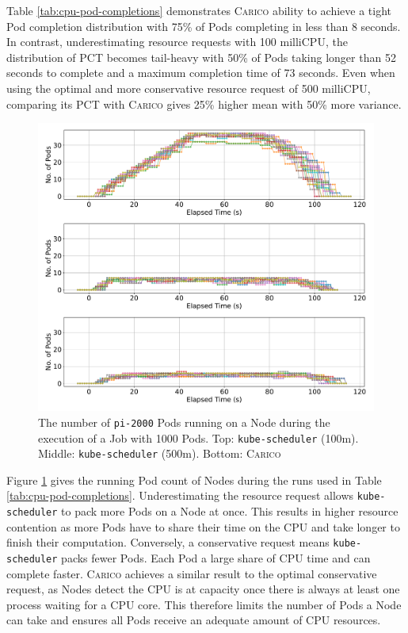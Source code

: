Table \ref{tab:cpu-pod-completions} demonstrates \textsc{Carico} ability to
achieve a tight Pod completion distribution with 75\% of Pods completing in less
than 8 seconds. In contrast, underestimating resource requests with 100
milliCPU, the distribution of PCT becomes tail-heavy with 50\% of Pods taking
longer than 52 seconds to complete and a maximum completion time of 73 seconds.
Even when using the optimal and more conservative resource request of 500
milliCPU, comparing its PCT with \textsc{Carico} gives 25\% higher mean with
50\% more variance.

\begin{figure}[ht!]
    \centering
    \includegraphics[width=\textwidth]{images/pi-running-pods.pdf}
    \caption{The number of \texttt{pi-2000} Pods running on a Node during the
    execution of a Job with 1000 Pods. Top: \texttt{kube-scheduler} (100m).
    Middle: \texttt{kube-scheduler} (500m). Bottom: \textsc{Carico}}
    \label{fig:pi-2000-1000x-pod-running}
\end{figure}

Figure \ref{fig:pi-2000-1000x-pod-running} gives the running Pod count of Nodes
during the runs used in Table \ref{tab:cpu-pod-completions}. Underestimating the
resource request allows \texttt{kube-scheduler} to pack more Pods on a Node at
once. This results in higher resource contention as more Pods have to share
their time on the CPU and take longer to finish their computation. Conversely,
a conservative request means \texttt{kube-scheduler} packs
fewer Pods. Each Pod a large share of CPU time and can complete faster.
\textsc{Carico} achieves a similar result to the optimal conservative request,
as Nodes detect the CPU is at capacity once there is always at least one process
waiting for a CPU core. This therefore limits the number of Pods a Node can take
and ensures all Pods receive an adequate amount of CPU resources.

